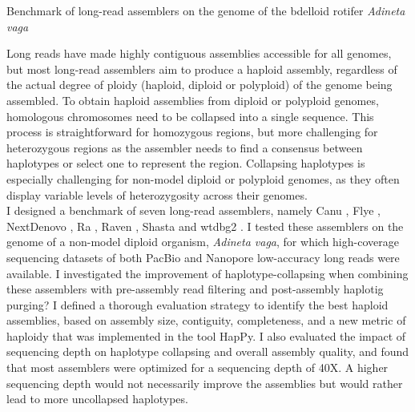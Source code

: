 \newenvironment{suppsection}{
\newcommand{\beginsupplement}{%
        \setcounter{table}{0}
        \renewcommand{\thetable}{S\arabic{table}}%
        \setcounter{figure}{0}
        \renewcommand{\thefigure}{S\arabic{figure}}%
     }
}

\chapter{Benchmark of long-read assemblers on the genome of the bdelloid rotifer \textit{Adineta vaga}}

Long reads have made highly contiguous assemblies accessible for all genomes, but most long-read assemblers aim to produce a haploid assembly, regardless of the actual degree of ploidy (haploid, diploid or polyploid) of the genome being assembled. To obtain haploid assemblies from diploid or polyploid genomes, homologous chromosomes need to be collapsed into a single sequence. This process is straightforward for homozygous regions, but more challenging for heterozygous regions as the assembler needs to find a consensus between haplotypes or select one to represent the region. Collapsing haplotypes is especially challenging for non-model diploid or polyploid genomes, as they often display variable levels of heterozygosity across their genomes. \\

I designed a benchmark of seven long-read assemblers, namely Canu \cite{canu}, Flye \cite{flye}, NextDenovo \cite{nextdenovo}, Ra \cite{ra}, Raven \cite{raven}, Shasta \cite{shasta} and wtdbg2 \cite{wtdbg2}. I tested these assemblers on the genome of a non-model diploid organism, \textit{Adineta vaga}, for which high-coverage sequencing datasets of both PacBio and Nanopore low-accuracy long reads were available. I investigated the improvement of haplotype-collapsing when combining these assemblers with pre-assembly read filtering and post-assembly haplotig purging? I defined a thorough evaluation strategy to identify the best haploid assemblies, based on assembly size, contiguity, completeness, and a new metric of haploidy that was implemented in the tool HapPy. I also evaluated the impact of sequencing depth on haplotype collapsing and overall assembly quality, and found that most assemblers were optimized for a sequencing depth of 40X. A higher sequencing depth would not necessarily improve the assemblies but would rather lead to more uncollapsed haplotypes. \\

